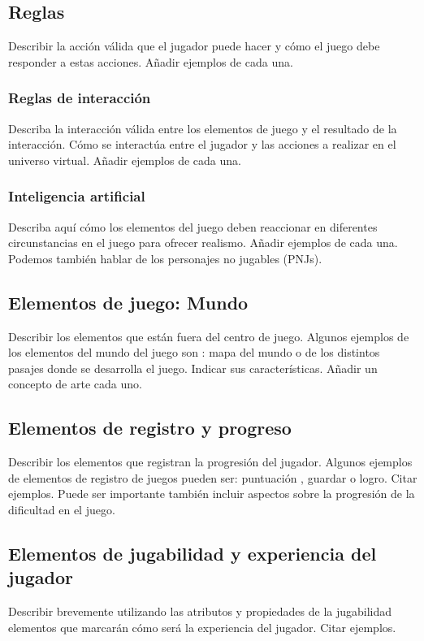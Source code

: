 \subsection{Reglas}
Describir la acción válida que el jugador puede hacer y cómo el juego debe responder a estas acciones. Añadir ejemplos de cada una.

\subsubsection{Reglas de interacción}
Describa la interacción válida entre los elementos de juego y el resultado de la interacción. Cómo se interactúa entre el jugador y las acciones a realizar en el universo virtual. Añadir ejemplos de cada una.

\subsubsection{Inteligencia artificial}
Describa aquí cómo los elementos del juego deben reaccionar en diferentes circunstancias en el juego para ofrecer realismo. Añadir ejemplos de cada una. Podemos también hablar de los personajes no jugables (PNJs).

\subsection{Elementos de juego: Mundo}
Describir los elementos que están fuera del centro de juego. Algunos ejemplos de los elementos del mundo del juego son : mapa del mundo o de los distintos pasajes donde se desarrolla el juego. Indicar sus características. Añadir un concepto de arte cada uno.

\subsection{Elementos de registro y progreso}
Describir los elementos que registran la progresión del jugador. Algunos ejemplos de elementos de registro de juegos pueden ser: puntuación , guardar o logro. Citar ejemplos. Puede ser importante también incluir aspectos sobre la progresión de la dificultad en el juego.

\subsection{Elementos de jugabilidad y experiencia del jugador}
Describir brevemente utilizando las atributos y propiedades de la jugabilidad elementos que marcarán cómo será la experiencia del jugador. Citar ejemplos.

